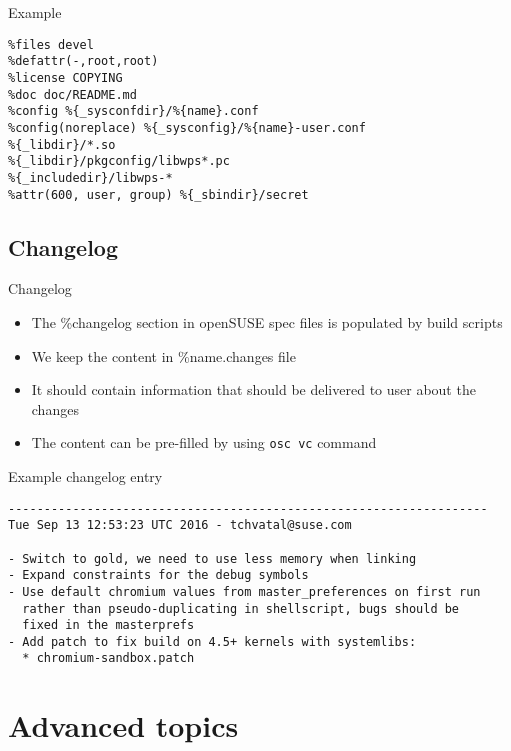\documentclass{beamer}
\begin{document}
\begin{frame}[fragile]{Example}
	\begin{small}
	\begin{verbatim}
%files devel
%defattr(-,root,root)
%license COPYING
%doc doc/README.md
%config %{_sysconfdir}/%{name}.conf
%config(noreplace) %{_sysconfig}/%{name}-user.conf
%{_libdir}/*.so
%{_libdir}/pkgconfig/libwps*.pc
%{_includedir}/libwps-*
%attr(600, user, group) %{_sbindir}/secret
	\end{verbatim}
	\end{small}
\end{frame}

\subsection{Changelog}

\begin{frame}[t]{Changelog}
	\begin{itemize}
	\item The \%changelog section in openSUSE spec files is populated by build scripts
	\item We keep the content in \%{name}.changes file
    \item It should contain information that should be delivered to user about the changes
    \item The content can be pre-filled by using \texttt{osc vc} command
	\end{itemize}
\end{frame}

\begin{frame}[fragile]{Example changelog entry}
	\begin{tiny}
	\begin{verbatim}
-------------------------------------------------------------------
Tue Sep 13 12:53:23 UTC 2016 - tchvatal@suse.com

- Switch to gold, we need to use less memory when linking
- Expand constraints for the debug symbols
- Use default chromium values from master_preferences on first run
  rather than pseudo-duplicating in shellscript, bugs should be
  fixed in the masterprefs
- Add patch to fix build on 4.5+ kernels with systemlibs:
  * chromium-sandbox.patch

	\end{verbatim}
	\end{tiny}
\end{frame}


\section{Advanced topics}
\end{document}
